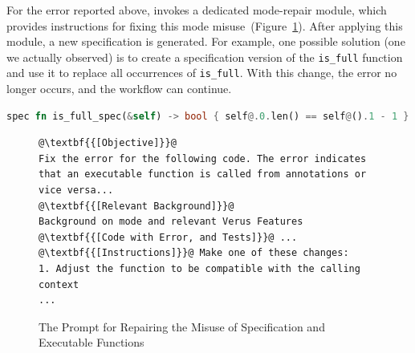 For the error reported above, \toolname{} invokes a dedicated mode-repair module, which provides instructions for fixing this mode misuse~(Figure~\ref{fig:prompt-mode-repair}). After applying this module, a new specification is generated.  For example, one possible solution (one we actually observed) is to create a specification version of the \texttt{is\_full} function and use it to replace all occurrences of \texttt{is\_full}. With this change, the error no longer occurs, and the workflow can continue.
\begin{lstlisting}[language=Rust,style=boxed,showstringspaces=false,basicstyle=\small\ttfamily]
spec fn is_full_spec(&self) -> bool { self@.0.len() == self@().1 - 1 }
\end{lstlisting}




\begin{figure}[htbp]
\begin{lstlisting}[basicstyle=\fontsize{7pt}{7pt}\normalfont\ttfamily,frame=single,breaklines=true,escapechar=@,breakindent=0pt,xrightmargin=3em,xleftmargin=3em]
@\textbf{{[Objective]}}@
Fix the error for the following code. The error indicates that an executable function is called from annotations or vice versa...
@\textbf{{[Relevant Background]}}@
Background on mode and relevant Verus Features
@\textbf{{[Code with Error, and Tests]}}@ ...
@\textbf{{[Instructions]}}@ Make one of these changes:
1. Adjust the function to be compatible with the calling context
...
\end{lstlisting}
\caption{The Prompt for Repairing the Misuse of Specification and Executable Functions}
\label{fig:prompt-mode-repair}
\end{figure}

